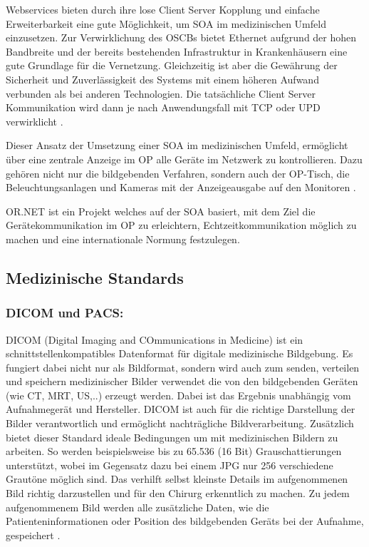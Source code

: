 Webservices bieten durch ihre lose Client Server Kopplung und einfache Erweiterbarkeit eine gute Möglichkeit, um SOA im medizinischen Umfeld einzusetzen. Zur Verwirklichung des OSCBs bietet Ethernet aufgrund der hohen Bandbreite und der bereits bestehenden Infrastruktur in Krankenhäusern eine gute Grundlage für die Vernetzung. Gleichzeitig ist aber die Gewährung der Sicherheit und Zuverlässigkeit des Systems mit einem höheren Aufwand verbunden als bei anderen Technologien.
Die tatsächliche Client Server Kommunikation wird dann je nach Anwendungsfall mit TCP oder UPD verwirklicht \cite{DerDigitaleOperationssaal}.

Dieser Ansatz der Umsetzung einer SOA im medizinischen Umfeld, ermöglicht über eine zentrale Anzeige im OP alle Geräte im Netzwerk zu kontrollieren. Dazu gehören nicht nur die bildgebenden Verfahren, sondern auch der OP-Tisch, die Beleuchtungsanlagen und Kameras mit der Anzeigeausgabe auf den Monitoren \cite{DerDigitaleOperationssaal}.

OR.NET ist ein Projekt welches auf der SOA basiert, mit dem Ziel die Gerätekommunikation im OP zu erleichtern, Echtzeitkommunikation möglich zu machen und eine internationale Normung festzulegen.

\subsection{Medizinische Standards}

\subsubsection{DICOM und PACS:}

DICOM (Digital Imaging and COmmunications in Medicine) ist ein schnittstellenkompatibles Datenformat für digitale medizinische Bildgebung. Es fungiert dabei nicht nur als Bildformat, sondern wird auch zum senden, verteilen und speichern medizinischer Bilder verwendet die von den bildgebenden Geräten (wie CT, MRT, US,..) erzeugt werden. Dabei ist das Ergebnis unabhängig vom Aufnahmegerät und Hersteller. DICOM ist auch für die richtige Darstellung der Bilder verantwortlich und ermöglicht nachträgliche Bildverarbeitung.
Zusätzlich bietet dieser Standard ideale Bedingungen um mit medizinischen Bildern zu arbeiten. So werden beispielsweise bis zu 65.536 (16 Bit) Grauschattierungen unterstützt, wobei im Gegensatz dazu bei einem JPG nur 256 verschiedene Grautöne möglich sind. Das verhilft selbst kleinste Details im aufgenommenen Bild richtig darzustellen und für den Chirurg erkenntlich zu machen. Zu jedem aufgenommenem Bild werden alle zusätzliche Daten, wie die Patienteninformationen oder Position des bildgebenden Geräts bei der Aufnahme, gespeichert \cite{DICOM}.

